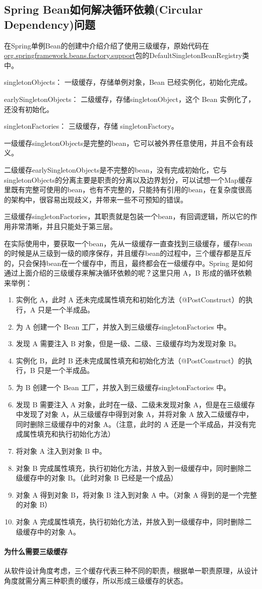 \documentclass[../../../interview-questions.tex]{subfiles}
\begin{document}
\subsection{Spring Bean如何解决循环依赖(Circular Dependency)问题}

在Spring单例Bean的创建中介绍介绍了使用三级缓存，原始代码在\url{org.springframework.beans.factory.support}包的DefaultSingletonBeanRegistry类中。

singletonObjects： 一级缓存，存储单例对象，Bean 已经实例化，初始化完成。

earlySingletonObjects： 二级缓存，存储singletonObject，这个 Bean 实例化了，还没有初始化。

singletonFactories： 三级缓存，存储 singletonFactory。

一级缓存singletonObjects是完整的bean，它可以被外界任意使用，并且不会有歧义。

二级缓存earlySingletonObjects是不完整的bean，没有完成初始化，它与singletonObjects的分离主要是职责的分离以及边界划分，可以试想一个Map缓存里既有完整可使用的bean，也有不完整的，只能持有引用的bean，在复杂度很高的架构中，很容易出现歧义，并带来一些不可预知的错误。

三级缓存singletonFactories，其职责就是包装一个bean，有回调逻辑，所以它的作用非常清晰，并且只能处于第三层。

在实际使用中，要获取一个bean，先从一级缓存一直查找到三级缓存，缓存bean的时候是从三级到一级的顺序保存，并且缓存bean的过程中，三个缓存都是互斥的，只会保持bean在一个缓存中，而且，最终都会在一级缓存中。Spring 是如何通过上面介绍的三级缓存来解决循环依赖的呢？这里只用 A，B 形成的循环依赖来举例：

\begin{enumerate}
    \item {实例化 A，此时 A 还未完成属性填充和初始化方法（@PostConstruct）的执行，A 只是一个半成品。}
    \item {为 A 创建一个 Bean 工厂，并放入到三级缓存singletonFactories 中。}
    \item {发现 A 需要注入 B 对象，但是一级、二级、三级缓存均为发现对象 B。}
    \item {实例化 B，此时 B 还未完成属性填充和初始化方法（@PostConstruct）的执行，B 只是一个半成品。}
    \item {为 B 创建一个 Bean 工厂，并放入到三级缓存singletonFactories 中。}
    \item {发现 B 需要注入 A 对象，此时在一级、二级未发现对象 A，但是在三级缓存中发现了对象 A，从三级缓存中得到对象 A，并将对象 A 放入二级缓存中，同时删除三级缓存中的对象 A。（注意，此时的 A 还是一个半成品，并没有完成属性填充和执行初始化方法）}
    \item {将对象 A 注入到对象 B 中。}
    \item {对象 B 完成属性填充，执行初始化方法，并放入到一级缓存中，同时删除二级缓存中的对象 B。（此时对象 B 已经是一个成品）}
    \item {对象 A 得到对象 B，将对象 B 注入到对象 A 中。（对象 A 得到的是一个完整的对象 B）}
    \item {对象 A 完成属性填充，执行初始化方法，并放入到一级缓存中，同时删除二级缓存中的对象 A。}
\end{enumerate}

\paragraph{为什么需要三级缓存}

从软件设计角度考虑，三个缓存代表三种不同的职责，根据单一职责原理，从设计角度就需分离三种职责的缓存，所以形成三级缓存的状态。
\end{document}
